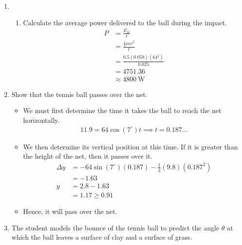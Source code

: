 \documentclass[a4paper,12pt]{article}
\newcommand{\degsym}{^{\circ}}
\begin{document}
\begin{enumerate}[label=(\alph*)]
  \item \begin{enumerate}[label=(\roman*)]
          \item Calculate the average power delivered to the ball during the impact.
                \begin{align*}
                  P & = \frac{E_K}{t}                  \\
                    & = \frac{\frac{1}{2}mv^2}{t}      \\
                    & = \frac{0.5(0.058)(64^2)}{0.025} \\
                    & = 4751.36                        \\
                    & \approx \SI{4800}{\watt}
                \end{align*}
        \end{enumerate}
  \item Show that the tennis ball passes over the net.
        \begin{itemize}
          \item We must first determine the time it takes the ball to reach the net horizontally.
                \begin{align*}
                  11.9 = 64\cos(7\degsym) t \implies t = 0.187...
                \end{align*}
          \item We then determine its vertical position at this time. If it is greater than the height of the net, then it passes over it.
                \begin{align*}
                  \Delta y & = -64\sin(7\degsym)(0.187) - \frac{1}{2}(9.8)(0.187^2) \\
                           & = -1.63                                                \\
                  y        & = 2.8 - 1.63                                           \\
                           & = 1.17 \ge0.91
                \end{align*}
          \item Hence, it will pass over the net.
        \end{itemize}
  \item The student models the bounce of the tennis ball to predict the angle $\theta$ at which the ball leaves a surface of clay and a surface of grass.


\end{enumerate}
\end{document}
